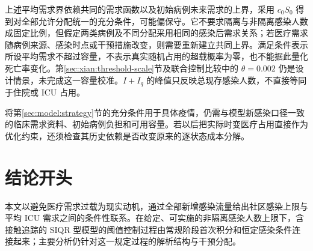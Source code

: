 \documentclass[UTF8,a4paper,zihao=-4,fontset=fandol]{ctexart}
\theoremstyle{remark}
\begin{document}
上述平均需求界依赖共同的需求函数以及初始病例未来需求的上界，采用 $c_0S_0$ 得到对全部允许分配统一的充分条件，可能偏保守。它不要求隔离与非隔离感染人数成固定比例，但假定两类病例及不同分配采用相同的感染后需求关系；若医疗需求随病例来源、感染时点或干预措施改变，则需要重新建立共同上界。满足条件表示所设平均需求不超过容量，不表示真实随机占用的超载概率为零，也不能据此量化死亡率变化。第\ref{sec:xian:threshold-scale}节及联合控制比较中的 $\theta=0.002$ 仍是设计情景，未完成这一容量校准。$I+I_q$ 的峰值只反映总现存感染人数，不直接等同于住院或 ICU 占用。

\medskip
将第\ref{sec:model:strategy}节的充分条件用于具体疫情，仍需与模型新感染口径一致的临床需求资料、初始病例负担和可用容量。若以后把实际时变医疗占用直接作为优化约束，还须检查其历史依赖是否改变原来的逐状态成本分解。
\section*{结论开头}
本文以避免医疗需求过载为现实动机，通过全部新增感染流量给出社区感染上限与平均 ICU 需求之间的条件性联系。在给定、可实施的非隔离感染人数上限下，含接触追踪的 SIQR 型模型的阈值控制过程由常规阶段首次积分和恒定感染条件连接起来；主要分析仍针对这一规定过程的解析结构与干预分配。
\clearpage
\printbibliography[title={阅读稿参考文献}]
\end{document}
